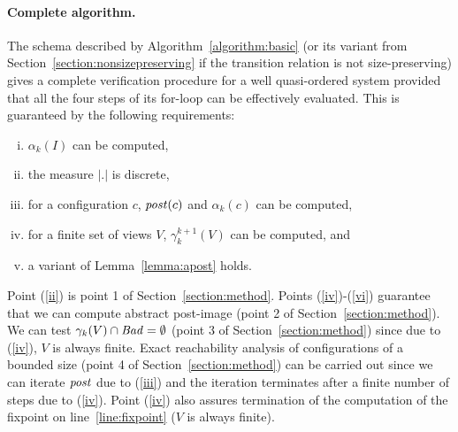 \paragraph{Complete algorithm.}
The schema described by Algorithm~\ref{algorithm:basic} (or its
variant from Section~\ref{section:nonsizepreserving} if the transition
relation is not size-preserving) gives a complete verification procedure for a well quasi-ordered system provided that all the four steps of its for-loop can be effectively evaluated.
This is guaranteed by the following requirements:
\begin{enumerate}[i.]
\item \label{ii}
$\alpha_k(I)$ can be computed,
\item \label{iv}
the measure $|.|$ is discrete, %
\item \label{iii}
for a configuration $c$, $\mathit{post}(c)$ and $\alpha_k(c)$ can be computed, 
\item \label{v}
for a finite set of views $V$, $\gamma_k^{k+1}(V)$ can be computed, and
\item \label{vi}
a variant of Lemma~\ref{lemma:apost} holds.
\end{enumerate}
%
%
%
Point (\ref{ii}) is point 1 of Section~\ref{section:method}.
Points (\ref{iv})-(\ref{vi}) guarantee that we can compute abstract post-image (point 2 of Section~\ref{section:method}). 
We can test $\gamma_k(V)\cap\mathit{Bad} = \emptyset$ (point 3 of Section~\ref{section:method}) since due to (\ref{iv}),
$V$ is always finite.
Exact reachability analysis of configurations of a bounded size (point 4 of Section~\ref{section:method}) can be carried out since we can iterate $\mathit{post}$ due to (\ref{iii}) and the iteration terminates after a finite number of steps  due to (\ref{iv}). 
%
Point (\ref{iv}) also assures termination of the computation of the fixpoint on line~\ref{line:fixpoint} ($V$ is always finite).


